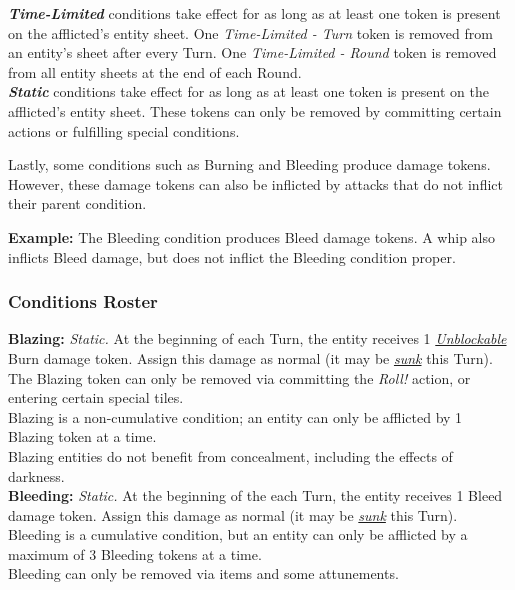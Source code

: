 \documentclass[12pt]{article}
\newcommand{\reftoit}[1]{\hyperlink{#1}{\emph{#1}}}
\begin{document}
\begin{multicols*}{2}
\emph{\textbf{Time-Limited}} conditions take effect for as long as at least one token is present on the afflicted’s entity sheet. One \emph{Time-Limited - Turn} token is removed from an entity’s sheet after every Turn. One \emph{Time-Limited - Round} token is removed from all entity sheets at the end of each Round.\\

\emph{\textbf{Static}}\hypertarget{Static}{} conditions take effect for as long as at least one token is present on the afflicted’s entity sheet. These tokens can only be removed by committing certain actions or fulfilling special conditions.

Lastly, some conditions such as Burning and Bleeding produce damage tokens. However, these damage tokens can also be inflicted by attacks that do not inflict their parent condition.

\begin{tcolorbox}
\textbf{Example:} The Bleeding condition produces Bleed damage tokens. A whip also inflicts Bleed damage, but does not inflict the Bleeding condition proper.
\end{tcolorbox}

\subsubsection{Conditions Roster}
\textbf{Blazing:} \emph{Static.} At the beginning of each Turn, the entity receives 1 \reftoit{Unblockable} Burn damage token. Assign this damage as normal (it may be \reftoit{sunk} this Turn).\\
The Blazing token can only be removed via committing the \emph{Roll!} action, or entering certain special tiles.\\
Blazing is a non-cumulative condition; an entity can only be afflicted by 1 Blazing token at a time.\\
Blazing entities do not benefit from concealment, including the effects of darkness.\\

\textbf{Bleeding:} \emph{Static.} At the beginning of the each Turn, the entity receives 1 Bleed damage token. Assign this damage as normal (it may be \reftoit{sunk} this Turn).\\
Bleeding is a cumulative condition, but an entity can only be afflicted by a maximum of 3 Bleeding tokens at a time.\\
Bleeding can only be removed via items and some attunements.\\


\end{multicols*}
\end{document}
